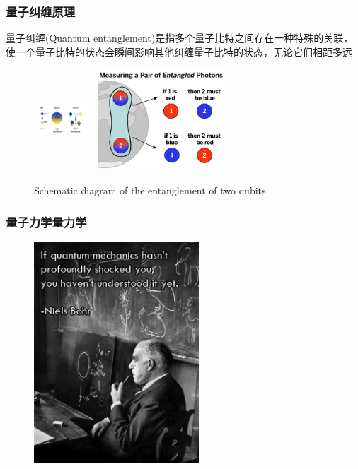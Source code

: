 \begin{frame}
    \frametitle{量子纠缠原理}
    量子纠缠\textrm{(Quantum entanglement)}是指多个量子比特之间存在一种特殊的关联，使一个量子比特的状态会瞬间影响其他纠缠量子比特的状态，无论它们相距多远
            \begin{figure}
        \centering
                \includegraphics[height=1.5in, width=0.8in, viewport=460 0 645 380,clip]{Figures/Illustration-of-a-bit_and_qubit.png}
                \includegraphics[height=1.5in, width=2.05in, viewport=0 0 980 775,clip]{Figures/Quantum_Entanglement_chart.png}
		\caption{\tiny{\textrm{Schematic diagram of the entanglement of two qubits.}}}
		\label{Fig:Illustration-of-a-qubit-entanglement}
            \end{figure}
	    \vskip -10pt
	    {\fontsize{7.5pt}{5.2pt}\selectfont{利用量子纠缠可以实现高效的信息传输和处理，是量子通信和量子计算的重要资源}}
\end{frame}

\frame
{
	\frametitle{量子力学量力学}
\begin{figure}[h!]
\centering
\vspace{-13.5pt}
\includegraphics[height=0.75\textwidth,width=0.55\textwidth,viewport=0 0 500 650,clip]{Figures/Quote-Niels_Bohr-on-Quantum_mechanics.png}
\caption{\fontsize{5.2pt}{3.9pt}}
\label{Quote-Niels_Bohr}
\end{figure}
}

